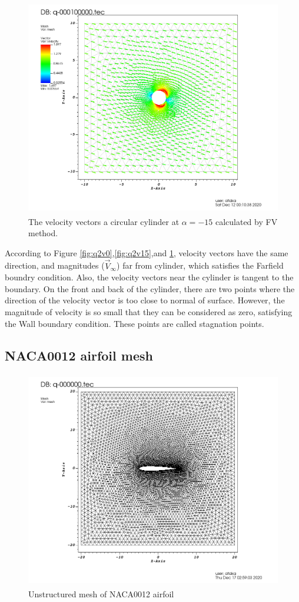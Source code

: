 \documentclass[letterpaper,12pt]{article}
\begin{document}
\begin{figure} [ht]
	\centering
	\includegraphics[height = 9.5cm]{graph/neg15deg/Cylinder_neg15angle_vector0000.png}
	\caption{The velocity vectors a circular cylinder at $\alpha=-15$ calculated by FV method.}
    \label{fig:q2v-15}
\end{figure}
According to Figure \ref{fig:q2v0},\ref{fig:q2v15},and \ref{fig:q2v-15}, velocity vectors have the 
same direction, and magnitudes ($\vec{V}_{\infty}$) far from cylinder, which satisfies the Farfield boundry condition.
Also, the velocity vectors near the cylinder is tangent to the boundary. On the front and back of the 
cylinder, there are two points where the direction of the velocity vector is too close to normal
of surface. However, the magnitude of velocity is so small that they can be considered as zero,
satisfying the Wall boundary condition. These points are called stagnation points.

\newpage

\subsection{NACA0012 airfoil mesh}

\begin{figure} [!h]
	\centering
	\includegraphics[height = 9.5cm]{graph/medium/medium_62650000.png}
	\caption{Unstructured mesh of NACA0012 airfoil}
    \label{fig:airfoilmesh}
\end{figure}
\end{document}

